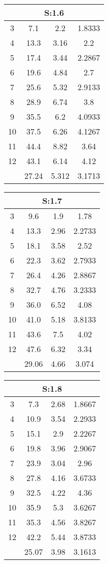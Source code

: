 	\begin{table}[H]
		\begin{tabular}{c|ccc}
			\multicolumn{4}{c}{S:1.6}\\\hline
			3 & 7.1 & 2.2 & 1.8333\\
			4 & 13.3 & 3.16 & 2.2\\
			5 & 17.4 & 3.44 & 2.2867\\
			6 & 19.6 & 4.84 & 2.7\\
			7 & 25.6 & 5.32 & 2.9133\\
			8 & 28.9 & 6.74 & 3.8\\
			9 & 35.5 & 6.2 & 4.0933\\
			10 & 37.5 & 6.26 & 4.1267\\
			11 & 44.4 & 8.82 & 3.64\\
			12 & 43.1 & 6.14 & 4.12\\
			\hline
			& 27.24 & 5.312 & 3.1713\\
		\end{tabular}
	\end{table}
	\begin{table}[H]
		\begin{tabular}{c|ccc}
			\multicolumn{4}{c}{S:1.7}\\\hline
			3 & 9.6 & 1.9 & 1.78\\
			4 & 13.3 & 2.96 & 2.2733\\
			5 & 18.1 & 3.58 & 2.52\\
			6 & 22.3 & 3.62 & 2.7933\\
			7 & 26.4 & 4.26 & 2.8867\\
			8 & 32.7 & 4.76 & 3.2333\\
			9 & 36.0 & 6.52 & 4.08\\
			10 & 41.0 & 5.18 & 3.8133\\
			11 & 43.6 & 7.5 & 4.02\\
			12 & 47.6 & 6.32 & 3.34\\
			\hline
			& 29.06 & 4.66 & 3.074\\
		\end{tabular}
	\end{table}
	\begin{table}[H]
		\begin{tabular}{c|ccc}
			\multicolumn{4}{c}{S:1.8}\\\hline
			3 & 7.3 & 2.68 & 1.8667\\
			4 & 10.9 & 3.54 & 2.2933\\
			5 & 15.1 & 2.9 & 2.2267\\
			6 & 19.8 & 3.96 & 2.9067\\
			7 & 23.9 & 3.04 & 2.96\\
			8 & 27.8 & 4.16 & 3.6733\\
			9 & 32.5 & 4.22 & 4.36\\
			10 & 35.9 & 5.3 & 3.6267\\
			11 & 35.3 & 4.56 & 3.8267\\
			12 & 42.2 & 5.44 & 3.8733\\
			\hline
			& 25.07 & 3.98 & 3.1613\\
		\end{tabular}
	\end{table}
